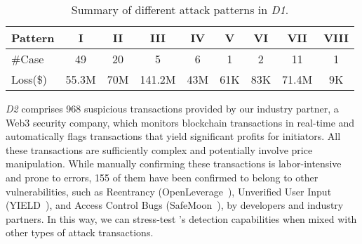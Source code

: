 \begin{table}[!t]
    \centering
    \small
    \vspace{2ex}
    \caption{Summary of different attack patterns in \textit{D1}.}
    \vspace{-2ex}
    \begin{tabular}{lcccccccc}
    \toprule
        Pattern & I & II & III & IV & V & VI & VII & VIII
        \\
        \midrule
        \#Case & 49 & 20 & 5 & 6 & 1 & 2 & 11 & 1\\
        Loss(\$) & 55.3M & 70M & 141.2M & 43M & 61K & 83K & 71.4M & 9K\\
        \bottomrule
    \end{tabular}
    \label{tab:distr_and_loss}
    \vspace{2ex}
\end{table}


\textit{D2} comprises 968 suspicious transactions provided by our industry partner, a Web3 security company, which monitors blockchain transactions in real-time and automatically flags transactions that yield significant profits for initiators.
All these transactions are sufficiently complex and potentially involve price manipulation.
While manually confirming these transactions is labor-intensive and prone to errors, 155 of them have been confirmed to belong to other vulnerabilities, such as Reentrancy (OpenLeverage~\cite{repo_openLeverage}), Unverified User Input (YIELD~\cite{repo_yield}), and Access Control Bugs (SafeMoon~\cite{repo_safeMoon}), by developers and industry partners.
In this way, we can stress-test \name's detection capabilities when mixed with other types of attack transactions. 

